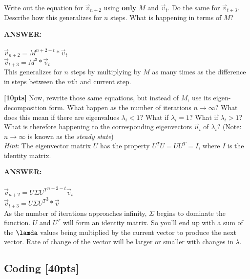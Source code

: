 \documentclass[paper=a4, fontsize=11pt]{scrartcl} %
\numberwithin{figure}{section} %
\numberwithin{table}{section} %
\begin{document}
Write out the equation for $\vec{v}_{n + 2}$ using \textbf{only} $M$ and $\vec{v}_t$. Do the same for $\vec{v}_{t + 3}$. Describe how this generalizes for $n$ steps. What is happening in terms of $M$? \\
\begin{addmargin}[2em]{2em}%
  \textbf{ANSWER:}\\\\
  $\vec{v}_{n + 2} = M^{n+2-t} * \vec{v}_t$\\
  $\vec{v}_{t + 3} = M^{3} * \vec{v}_t$\\

  This generalizes for $n$ steps by multiplying by $M$ as many times as the difference in steps between the $n$th and current step.
  \\

\end{addmargin}
\textbf{[10pts]} Now, rewrite those same equations, but instead of $M$, use its eigen-decomposition form. What happen as the number of iterations $n \rightarrow \infty$? What does this mean if there are eigenvalues $\lambda_i < 1$? What if $\lambda_i = 1$? What if $\lambda_i > 1$? What is therefore happening to the corresponding eigenvectors $\vec{u}_i$ of $\lambda_i$? (Note: $n \rightarrow \infty$ is known as the \emph{steady state}) \\

\emph{Hint}: The eigenvector matrix $U$ has the property $U^TU = UU^T = I$, where $I$ is the identity matrix.
\begin{addmargin}[2em]{2em}%
  \textbf{ANSWER:}\\\\
  $\vec{v}_{n + 2} = {U \Sigma U^T}^{n+2-t}  \vec{v}_t$\\
  $\vec{v}_{t + 3} = {U \Sigma U^T}^{3} * \vec{v}$\\

  As the number of iterations approaches infinity, $\Sigma$ begins to dominate the function. $U$ and $U^T$ will form an identity matrix. So you'll end up with a sum of the $\lamda$ values being multiplied by the current vector to produce the next vector. Rate of change of the vector will be larger or smaller with changes in $\lambda$.
  \\

\end{addmargin}
\subsection{Coding \textbf{[40pts]}}
\end{document}

